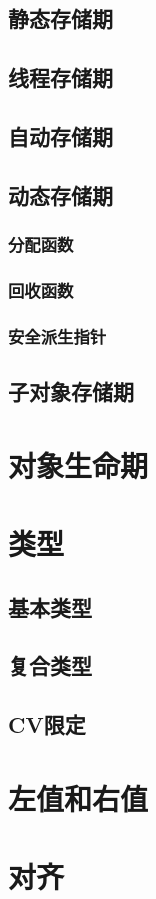 \subsection{静态存储期}
\subsection{线程存储期}
\subsection{自动存储期}

\subsection{动态存储期}
\subsubsection{分配函数}
\subsubsection{回收函数}
\subsubsection{安全派生指针}

\subsection{子对象存储期}

\section{对象生命期}

\section{类型}
\subsection{基本类型}
\subsection{复合类型}
\subsection{CV限定}

\section{左值和右值}

\section{对齐}

